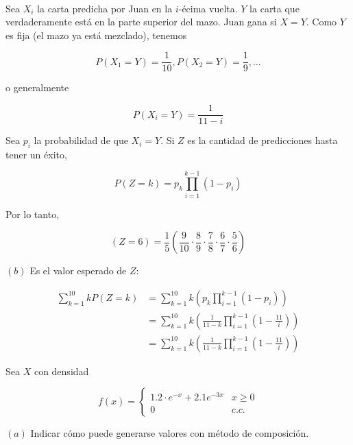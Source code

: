 \documentclass[a4paper, 12pt]{article}
\begin{document}
~


Sea $X_i$ la carta predicha por Juan en la $i$-écima vuelta. $Y$ la carta que
verdaderamente está en la parte superior del mazo. Juan gana si $X = Y$. Como
$Y$ es fija (el mazo ya está mezclado), tenemos 

\begin{equation*}
  P(X_1 = Y) = \frac{1}{10}, P(X_2 = Y) = \frac{1}{9}, \ldots
\end{equation*}

o generalmente 

\begin{equation*}
  P(X_i = Y) = \frac{1}{11-i}
\end{equation*}

Sea $p_i$ la probabilidad de que $X_i = Y$. Si $Z$ es la cantidad de
predicciones hasta tener un éxito,

\begin{equation*}
  P(Z = k) = p_k \prod_{i=1}^{k-1} (1 - p_i) 
\end{equation*}

Por lo tanto, 

\begin{equation*}
  (Z = 6) = \frac{1}{5} \left( \frac{9}{10} \cdot \frac{8}{9} \cdot \frac{7}{8}
  \cdot \frac{6}{7} \cdot \frac{5}{6}\right) 
\end{equation*}

$(b)$ Es el valor esperado de $Z$:

\begin{align*}
  \sum_{k=1}^{10} kP(Z = k) 
  &= \sum_{k=1}^{10} k \left( p_k\prod_{i=1}^{k-1}(1 -
  p_i) \right)   \\ 
  &=\sum_{k=1}^{10} k \left( \frac{1}{11 - k} \prod_{i=1}^{k-1}(1 -
  \frac{11}{i}) \right)  \\ 
  &=\sum_{k=1}^{10} k \left( \frac{1}{11 - k} \prod_{i=1}^{k-1}(1 -
  \frac{11}{i}) \right)  
\end{align*}

\pagebreak 

Sea $X$ con densidad 

\begin{equation*}
  f(x) = \begin{cases}
    1.2 \cdot e^{-x} + 2.1 e^{-3x} & x \geq 0 \\ 
    0 & c.c.
  \end{cases}
\end{equation*}

$(a)$ Indicar cómo puede generarse valores con método de composición. 
\end{document}
